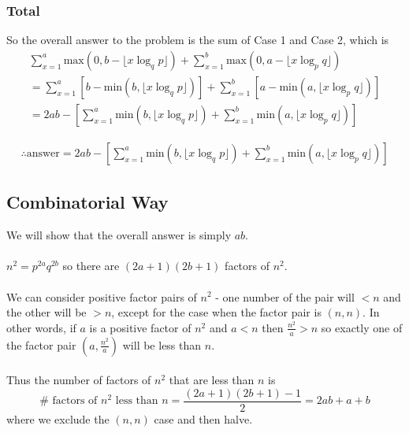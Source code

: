 \documentclass{article}
\begin{document}
\subsubsection{Total}
So the overall answer to the problem is the sum of Case 1 and Case 2, which is
\begin{equation*}
\begin{split}
    \sum_{x=1}^a \text{max}(0, b - \lfloor x \log_q p\rfloor) + \sum_{x=1}^b \text{max}(0, a - \lfloor x \log_p q\rfloor)\\
    = \sum_{x=1}^a \left[ b - \text{min}(b, \lfloor x \log_q p\rfloor) \right] + \sum_{x=1}^b \left[ a - \text{min}(a, \lfloor x \log_p q\rfloor) \right] \\
    = 2ab - \left[ \sum_{x=1}^a \text{min}(b, \lfloor x \log_q p\rfloor) + \sum_{x=1}^b \text{min}(a, \lfloor x \log_p q\rfloor) \right]
\end{split}
\end{equation*}
\begin{tcolorbox}
\begin{equation}
\begin{split}
    \therefore \text{answer} = 2ab - \left[ \sum_{x=1}^a \text{min}(b, \lfloor x \log_q p\rfloor) + \sum_{x=1}^b \text{min}(a, \lfloor x \log_p q\rfloor) \right]
\end{split}
\end{equation}
\end{tcolorbox}





\subsection{Combinatorial Way}

We will show that the overall answer is simply $ab$.\\\\
$n^2 = p^{2a}q^{2b}$ so there are $(2a+1)(2b+1)$ factors of $n^2$.\\\\
We can consider positive factor pairs of $n^2$ - one number of the pair will $<n$ and the other will be $>n$, except for the case when the factor pair is $(n, n)$. In other words, if $a$ is a positive factor of $n^2$ and $a<n$ then $\frac{n^2}{a} > n$ so exactly one of the factor pair $(a, \frac{n^2}{a})$ will be less than $n$.\\\\
Thus the number of factors of $n^2$ that are less than $n$ is
\[ \# \text{ factors of }n^2 \text{ less than }n = \frac{(2a+1)(2b+1) - 1}{2} = 2ab + a + b\]
where we exclude the $(n, n)$ case and then halve.\\\\
\end{document}
